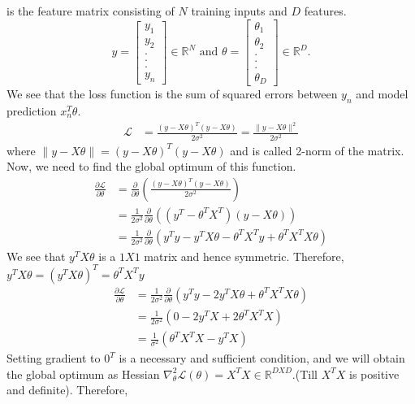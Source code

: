 \documentclass[12pt]{article}
\numberwithin{equation}{section}
\begin{document}
is the feature matrix consisting of $N$ training inputs and $D$ features.
$$y = \begin{bmatrix}
	y_{1}\\
	y_{2}\\
	.\\
	.\\
	.\\
	y_{n}
\end{bmatrix} \in \mathbb{R}^N \text{ and } 
\theta = \begin{bmatrix}
	\theta_{1}\\
	\theta_{2}\\
	.\\
	.\\
	.\\
	\theta_{D}
\end{bmatrix} \in \mathbb{R}^D.$$
We see that the loss function is the sum of squared errors between $y_{n}$ and model prediction $x_{n}^T\theta$.
\begin{align*}
	\mathcal{L}&=\frac{(y-X\theta)^T(y-X\theta)}{2\sigma^2}=\frac{\|y-X\theta\|^2}{2\sigma^2}
\end{align*}
where $\|y-X\theta\| = (y-X\theta)^T(y-X\theta)$ and is called 2-norm of the matrix. Now, we need to find the global optimum of this function.
\begin{align*}
	\frac{\partial \mathcal{L}}{\partial \theta}&=\frac{\partial}{\partial \theta}(\frac{(y-X\theta)^T(y-X\theta)}{2\sigma^2})\\
	&=\frac{1}{2\sigma^2}\frac{\partial}{\partial \theta}((y^T - \theta^TX^T)(y - X\theta))\\
	&=\frac{1}{2\sigma^2}\frac{\partial}{\partial \theta}(y^{T}y-y^{T}X\theta-\theta^{T}X^{T}y+\theta^{T}X^{T}X\theta)
\end{align*}
We see that $y^TX\theta$ is a $1X1$ matrix and hence symmetric. Therefore, $y^TX\theta = (y^TX\theta)^T = \theta^TX^Ty$
\begin{align}\label{mle1}
	\frac{\partial \mathcal{L}}{\partial \theta}&=\frac{1}{2\sigma^2}\frac{\partial}{\partial \theta}(y^Ty - 2y^TX\theta + \theta^TX^TX\theta)\\ \nonumber
	&=\frac{1}{2\sigma^2}(0 - 2y^TX + 2\theta^TX^TX)\\ \nonumber
	&=\frac{1}{\sigma^2}(\theta^TX^TX - y^TX) 
\end{align}
Setting gradient to $0^T$ is a necessary and sufficient condition, and we will obtain the global optimum as Hessian $\nabla_{\theta}^2\mathcal{L}(\theta) = X^TX \in \mathbb{R}^{DXD}$.(Till $X^TX$ is positive and definite). Therefore,
\end{document}
